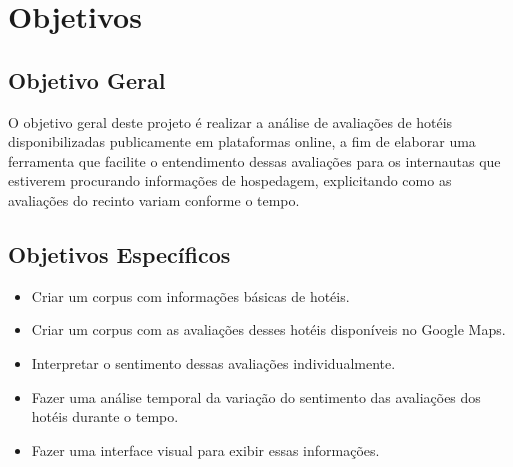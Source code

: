 \chapter{Objetivos}

\label{cap:objetivos}

\section{Objetivo Geral}

O objetivo geral deste projeto é realizar a análise de avaliações de hotéis disponibilizadas publicamente em plataformas online, a fim de elaborar uma ferramenta que facilite o entendimento dessas avaliações para os internautas que estiverem procurando informações de hospedagem, explicitando como as avaliações do recinto variam conforme o tempo.

\section{Objetivos Específicos}

\begin{itemize} 
    \item Criar um corpus com informações básicas de hotéis.
    \item Criar um corpus com as avaliações desses hotéis disponíveis no Google Maps.
    \item Interpretar o sentimento dessas avaliações individualmente.
    \item Fazer uma análise temporal da variação do sentimento das avaliações dos hotéis durante o tempo.
    \item Fazer uma interface visual para exibir essas informações.
\end{itemize}

